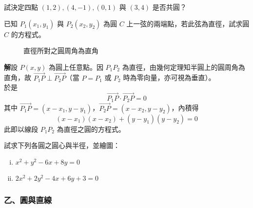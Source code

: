 \begin{exercise}
試決定四點 $(1,2), (4,-1), (0,1)$ 與 $(3,4)$ 是否共圓？
\end{exercise}

\begin{example}
已知 $P_1(x_1, y_1)$ 與 $P_2(x_2, y_2)$ 為圓 $C$ 上一弦的兩端點，若此弦為直徑，試求圓 $C$ 的方程式。

\begin{figure}[htbp]
\centering
{}
\caption{直徑所對之圓周角為直角}
\label{fig:b4-3-34}
\end{figure}

\textbf{解}\quad 設 $P(x,y)$ 為圓上任意點。因 $P_1P_2$ 為直徑，由幾何定理知半圓上的圓周角為直角，故 $\vec{P_1P} \perp \vec{P_2P}$（當 $P=P_1$ 或 $P_2$ 時為零向量，亦可視為垂直）。\\
於是
\[ \vec{P_1P} \cdot \vec{P_2P} = 0 \]
其中 $\vec{P_1P} = (x - x_1, y - y_1)$，$\vec{P_2P} = (x - x_2, y - y_2)$，內積得
\[ (x - x_1)(x - x_2) + (y - y_1)(y - y_2) = 0 \]
此即以線段 $P_1P_2$ 為直徑之圓的方程式。
\end{example}

\begin{exercise}
試求下列各圓之圓心與半徑，並繪圖：
\begin{enumerate}[(i)]
  \item $x^2 + y^2 - 6x + 8y = 0$
  \item $2x^2 + 2y^2 - 4x + 6y + 3 = 0$
\end{enumerate}
\end{exercise}

\subsubsection*{乙、圓與直線}

